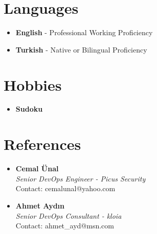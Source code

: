 \documentclass[a4paper,10pt]{article}
\begin{document}
\section*{Languages}
\begin{itemize}[leftmargin=0.5cm]
    \item \textbf{English} - Professional Working Proficiency
    \item \textbf{Turkish} - Native or Bilingual Proficiency
\end{itemize}

\section*{Hobbies}
\begin{itemize}[leftmargin=0.5cm]
    \item \textbf{Sudoku}
\end{itemize}

\section*{References}
\begin{itemize}[leftmargin=0.5cm]
    \item \textbf{Cemal Ünal} \\
    \textit{Senior DevOps Engineer - Picus Security} \\
    Contact: cemalunal@yahoo.com
    \item \textbf{Ahmet Aydın} \\
    \textit{Senior DevOps Consultant - kloia} \\
    Contact: ahmet\_ayd@msn.com
\end{itemize}
\end{document}
